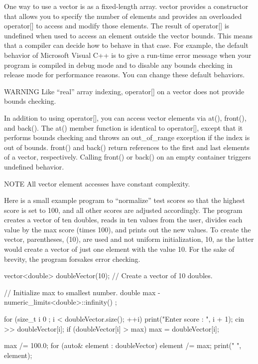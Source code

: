 
One way to use a vector is as a fixed-length array. vector provides a constructor that allows you to specify the number of elements and provides an overloaded operator[] to access and modify those elements. The result of operator[] is undefined when used to access an element outside the vector bounds. This means that a compiler can decide how to behave in that case. For example, the default behavior of Microsoft Visual C++ is to give a run-time error message when your program is compiled in debug mode and to disable any bounds checking in release mode for performance reasons. You can change these default behaviors.

\begin{myWarning}{WARNING}
Like “real” array indexing, operator[] on a vector does not provide bounds checking.
\end{myWarning}

In addition to using operator[], you can access vector elements via at(), front(), and back(). The at() member function is identical to operator[], except that it performs bounds checking and throws an out\_of\_range exception if the index is out of bounds. front() and back() return references to the first and last elements of a vector, respectively. Calling front() or back() on an empty container triggers undefined behavior.

\begin{myNotic}{NOTE}
All vector element accesses have constant complexity.
\end{myNotic}

Here is a small example program to “normalize” test scores so that the highest score is set to 100, and all other scores are adjusted accordingly. The program creates a vector of ten doubles, reads in ten values from the user, divides each value by the max score (times 100), and prints out the new values. To create the vector, parentheses, (10), are used and not uniform initialization, {10}, as the latter would create a vector of just one element with the value 10. For the sake of brevity, the program forsakes error checking.

\begin{cpp}
vector<double> doubleVector(10); // Create a vector of 10 doubles.

// Initialize max to smallest number.
double max { -numeric_limits<double>::infinity() };

for (size_t i { 0 }; i < doubleVector.size(); ++i) {
    print("Enter score {}: ", i + 1);
    cin >> doubleVector[i];
    if (doubleVector[i] > max) {
        max = doubleVector[i];
    }
}

max /= 100.0;
for (auto& element : doubleVector) {
    element /= max;
    print("{} ", element);
}
\end{cpp}

